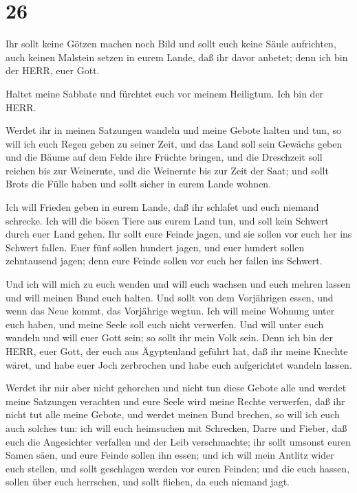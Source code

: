 \hypertarget{section-25}{%
\section{26}\label{section-25}}

 Ihr sollt keine Götzen machen noch Bild und sollt euch
keine Säule aufrichten, auch keinen Malstein setzen in eurem Lande, daß
ihr davor anbetet; denn ich bin der HERR, euer Gott.

 Haltet meine Sabbate und fürchtet euch vor meinem
Heiligtum. Ich bin der HERR.

 Werdet ihr in meinen Satzungen wandeln und meine Gebote
halten und tun,  so will ich euch Regen geben zu seiner
Zeit, und das Land soll sein Gewächs geben und die Bäume auf dem Felde
ihre Früchte bringen,  und die Dreschzeit soll reichen bis
zur Weinernte, und die Weinernte bis zur Zeit der Saat; und sollt Brots
die Fülle haben und sollt sicher in eurem Lande wohnen.

 Ich will Frieden geben in eurem Lande, daß ihr schlafet und
euch niemand schrecke. Ich will die bösen Tiere aus eurem Land tun, und
soll kein Schwert durch euer Land gehen.  Ihr sollt eure
Feinde jagen, und sie sollen vor euch her ins Schwert fallen.
 Euer fünf sollen hundert jagen, und euer hundert sollen
zehntausend jagen; denn eure Feinde sollen vor euch her fallen ins
Schwert.

 Und ich will mich zu euch wenden und will euch wachsen und
euch mehren lassen und will meinen Bund euch halten.  Und
sollt von dem Vorjährigen essen, und wenn das Neue kommt, das Vorjährige
wegtun.  Ich will meine Wohnung unter euch haben, und meine
Seele soll euch nicht verwerfen.  Und will unter euch
wandeln und will euer Gott sein; so sollt ihr mein Volk sein.
 Denn ich bin der HERR, euer Gott, der euch aus Ägyptenland
geführt hat, daß ihr meine Knechte wäret, und habe euer Joch zerbrochen
und habe euch aufgerichtet wandeln lassen.

 Werdet ihr mir aber nicht gehorchen und nicht tun diese
Gebote alle  und werdet meine Satzungen verachten und eure
Seele wird meine Rechte verwerfen, daß ihr nicht tut alle meine Gebote,
und werdet meinen Bund brechen,  so will ich euch auch
solches tun: ich will euch heimsuchen mit Schrecken, Darre und Fieber,
daß euch die Angesichter verfallen und der Leib verschmachte; ihr sollt
umsonst euren Samen säen, und eure Feinde sollen ihn essen;
 und ich will mein Antlitz wider euch stellen, und sollt
geschlagen werden vor euren Feinden; und die euch hassen, sollen über
euch herrschen, und sollt fliehen, da euch niemand jagt.


